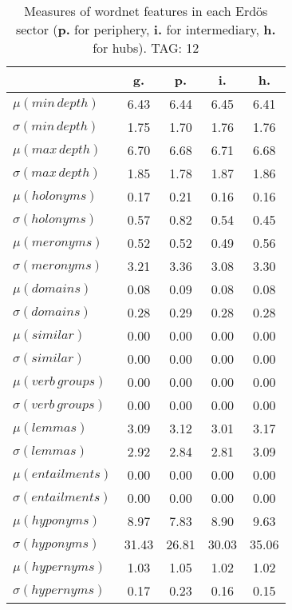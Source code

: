 \begin{table}[h!]
\begin{center}
\begin{tabular}{| l | c | c | c | c |}\hline
 & g. & p. & i. & h. \\\hline
$\mu(min\,depth)$ & 6.43  & 6.44  & 6.45  & 6.41 \\\hline
$\sigma(min\,depth)$ & 1.75  & 1.70  & 1.76  & 1.76 \\\hline
$\mu(max\,depth)$ & 6.70  & 6.68  & 6.71  & 6.68 \\\hline
$\sigma(max\,depth)$ & 1.85  & 1.78  & 1.87  & 1.86 \\\hline
$\mu(holonyms)$ & 0.17  & 0.21  & 0.16  & 0.16 \\\hline
$\sigma(holonyms)$ & 0.57  & 0.82  & 0.54  & 0.45 \\\hline
$\mu(meronyms)$ & 0.52  & 0.52  & 0.49  & 0.56 \\\hline
$\sigma(meronyms)$ & 3.21  & 3.36  & 3.08  & 3.30 \\\hline
$\mu(domains)$ & 0.08  & 0.09  & 0.08  & 0.08 \\\hline
$\sigma(domains)$ & 0.28  & 0.29  & 0.28  & 0.28 \\\hline
$\mu(similar)$ & 0.00  & 0.00  & 0.00  & 0.00 \\\hline
$\sigma(similar)$ & 0.00  & 0.00  & 0.00  & 0.00 \\\hline
$\mu(verb\,groups)$ & 0.00  & 0.00  & 0.00  & 0.00 \\\hline
$\sigma(verb\,groups)$ & 0.00  & 0.00  & 0.00  & 0.00 \\\hline
$\mu(lemmas)$ & 3.09  & 3.12  & 3.01  & 3.17 \\\hline
$\sigma(lemmas)$ & 2.92  & 2.84  & 2.81  & 3.09 \\\hline
$\mu(entailments)$ & 0.00  & 0.00  & 0.00  & 0.00 \\\hline
$\sigma(entailments)$ & 0.00  & 0.00  & 0.00  & 0.00 \\\hline
$\mu(hyponyms)$ & 8.97  & 7.83  & 8.90  & 9.63 \\\hline
$\sigma(hyponyms)$ & 31.43  & 26.81  & 30.03  & 35.06 \\\hline
$\mu(hypernyms)$ & 1.03  & 1.05  & 1.02  & 1.02 \\\hline
$\sigma(hypernyms)$ & 0.17  & 0.23  & 0.16  & 0.15 \\\hline
\end{tabular}
\caption{Measures of wordnet features in each Erd\"os sector ({{\bf p.}} for periphery, {{\bf i.}} for intermediary, {{\bf h.}} for hubs). TAG: 12}
\end{center}
\end{table}